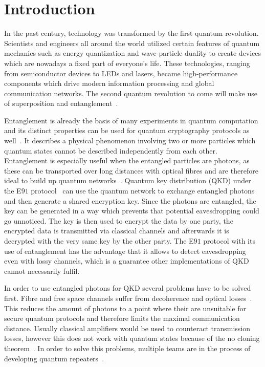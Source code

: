 \chapter{Introduction}

In the past century, technology was transformed by the first quantum revolution. Scientists and engineers all around the world utilized certain features of quantum mechanics such as energy quantization and wave-particle duality to create devices which are nowadays a fixed part of everyone's life.
These technologies, ranging from semiconductor devices to LEDs and lasers, became high-performance components which drive modern information processing and global communication networks.
The second quantum revolution to come will make use of superposition and entanglement~\cite{aharonovich_solid-state_2016}\cite{macfarlane_quantum_2003}.

Entanglement is already the basis of many experiments in quantum computation and its distinct properties can be used for quantum cryptography protocols as well~\cite{zeilinger_light_2017}.
It describes a physical phenomenon involving two or more particles which quantum states cannot be described independently from each other.
Entanglement is especially useful when the entangled particles are photons, as these can be transported over long distances with optical fibres and are therefore ideal to build up quantum networks~\cite{gisin_quantum_2002}.
Quantum key distribution (QKD) under the E$91$ protocol~\cite{ekert_quantum_1991} can use the quantum network to exchange entangled photons and then generate a shared encryption key.
Since the photons are entangled, the key can be generated in a way which prevents that potential eavesdropping could go unnoticed.
The key is then used to encrypt the data by one party, the encrypted data is transmitted via classical channels and afterwards it is decrypted with the very same key by the other party.
The E$91$ protocol with its use of entanglement has the advantage that it allows to detect eavesdropping even with lossy channels, which is a guarantee other implementations of QKD cannot necessarily fulfil.

In order to use entangled photons for QKD several problems have to be solved first.
Fibre and free space channels suffer from decoherence and optical losses~\cite{sangouard_quantum_2011}.
This reduces the amount of photons to a point where their are unsuitable for secure quantum protocols and therefore limits the maximal communication distance.
Usually classical amplifiers would be used to counteract transmission losses, however this does not work with quantum states because of the no cloning theorem~\cite{park_concept_1970}.
In order to solve this problems, multiple teams are in the process of developing quantum repeaters~\cite{reindl_all-photonic_2018}\cite{duan_long-distance_2001}\cite{simon_quantum_2007}.

